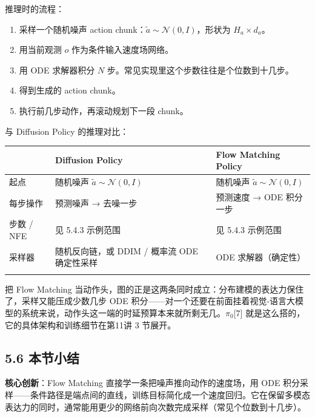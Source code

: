 \documentclass[
  chinese,
]{ctexart}
\providecommand{\tightlist}{%
  \setlength{\itemsep}{0pt}\setlength{\parskip}{0pt}}
\begin{document}
推理时的流程：

\begin{enumerate}
\def\labelenumi{\arabic{enumi}.}
\tightlist
\item
  采样一个随机噪声 action
  chunk：\(\tilde{a} \sim \mathcal{N}(0, I)\)，形状为
  \(H_a \times d_a\)。
\item
  用当前观测 \(o\) 作为条件输入速度场网络。
\item
  用 ODE 求解器积分 \(N\) 步。常见实现里这个步数往往是个位数到十几步。
\item
  得到生成的 action chunk。
\item
  执行前几步动作，再滚动规划下一段 chunk。
\end{enumerate}

与 Diffusion Policy 的推理对比：

\begin{center}
\begin{tabular}{@{}>{\raggedright\arraybackslash}p{} >{\raggedright\arraybackslash}p{} >{\raggedright\arraybackslash}p{}@{}}
\toprule\noalign{}
 & Diffusion Policy & Flow Matching Policy \\
\midrule\noalign{}
起点 & 随机噪声 \(\tilde{a} \sim \mathcal{N}(0, I)\) & 随机噪声 \(\tilde{a} \sim \mathcal{N}(0, I)\) \\
每步操作 & 预测噪声 → 去噪一步 & 预测速度 → ODE 积分一步 \\
步数 / NFE & 见 5.4.3 示例范围 & 见 5.4.3 示例范围 \\
采样器 & 随机反向链，或 DDIM / 概率流 ODE 确定性采样 & ODE 求解器（确定性） \\
\bottomrule\noalign{}
\end{tabular}
\end{center}

把 Flow Matching
当动作头，图的正是这两条同时成立：分布建模的表达力保住了，采样又能压成少数几步
ODE
积分------对一个还要在前面挂着视觉-语言大模型的系统来说，动作头这一端的时延预算本来就所剩无几。\(\pi_0\){[}7{]}
就是这么搭的，它的具体架构和训练细节在第11讲 3 节展开。

\subsection{5.6 本节小结}\label{ux672cux8282ux5c0fux7ed3-2}

\textbf{核心创新}：Flow Matching 直接学一条把噪声推向动作的速度场，用
ODE
积分采样------条件路径是端点间的直线，训练目标简化成一个速度回归。它在保留多模态表达力的同时，通常能用更少的网络前向次数完成采样（常见个位数到十几步）。
\end{document}
